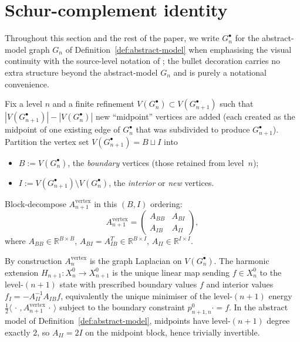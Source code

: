 \documentclass[11pt]{article}
\theoremstyle{plain}
\theoremstyle{definition}
\theoremstyle{remark}
\newcommand{\R}{\mathbb{R}}
\begin{document}
\section{Schur-complement identity}\label{sec:schur}

Throughout this section and the rest of the paper, we write
$G_n^{\bullet}$ for the abstract-model graph $G_n$ of
Definition~\ref{def:abstract-model} when emphasising the visual
continuity with the source-level notation of
\cite{CascadeRefinementSpaces, CascadeClosureDynamics}; the bullet
decoration carries no extra structure beyond the abstract-model
$G_n$ and is purely a notational convenience.

Fix a level $n$ and a finite refinement
$V(G_n^{\bullet}) \subset V(G_{n+1}^{\bullet})$ such that
$|V(G_{n+1}^{\bullet})| - |V(G_n^{\bullet})|$ new ``midpoint''
vertices are added (each created as the midpoint of one existing
edge of $G_n^{\bullet}$ that was subdivided to produce
$G_{n+1}^{\bullet}$). Partition the vertex set
$V(G_{n+1}^{\bullet}) = B \sqcup I$ into
\begin{itemize}[nosep]
\item $B := V(G_n^{\bullet})$, the \emph{boundary} vertices (those
  retained from level~$n$);
\item $I := V(G_{n+1}^{\bullet}) \setminus V(G_n^{\bullet})$, the
  \emph{interior} or \emph{new} vertices.
\end{itemize}
Block-decompose $A_{n+1}^{\mathrm{vertex}}$ in this $(B, I)$ ordering:
\begin{equation}\label{eq:block}
   A_{n+1}^{\mathrm{vertex}} =
     \begin{pmatrix} A_{BB} & A_{BI} \\ A_{IB} & A_{II} \end{pmatrix},
\end{equation}
where
$A_{BB} \in \R^{B \times B}$,
$A_{BI} = A_{IB}^{T} \in \R^{B \times I}$,
$A_{II} \in \R^{I \times I}$.

By construction $A_n^{\mathrm{vertex}}$ is the graph Laplacian on
$V(G_n^{\bullet})$. The harmonic extension
$H_{n+1} : X_n^{0} \to X_{n+1}^{0}$ is the unique linear map sending
$f \in X_n^{0}$ to the level-$(n+1)$ state with prescribed boundary
values $f$ and interior values
$f_I = -A_{II}^{-1} A_{IB} f$, equivalently the unique minimiser of
the level-$(n+1)$ energy
$\tfrac12 \langle \,\cdot\, , A_{n+1}^{\mathrm{vertex}}\,\cdot\,\rangle$
subject to the boundary constraint
$p^{0}_{n+1, n} \cdot = f$. In the abstract model of
Definition~\ref{def:abstract-model}, midpoints have level-$(n+1)$
degree exactly $2$, so $A_{II} = 2 I$ on the midpoint block, hence
trivially invertible.
\end{document}
